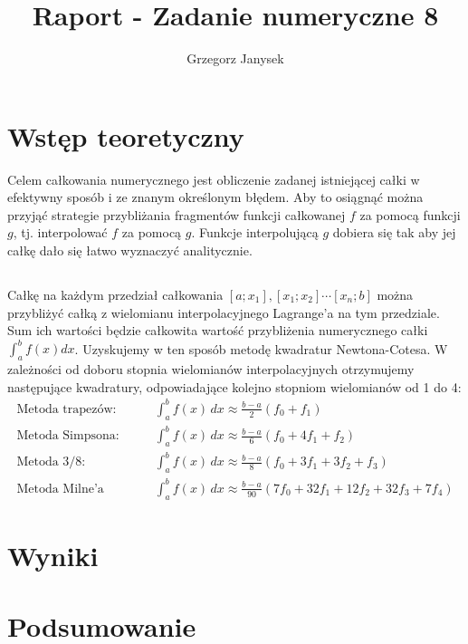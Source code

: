 \documentclass[11pt]{extarticle}
\author{Grzegorz Janysek}
\title{Raport - Zadanie numeryczne 8}
\begin{document}
	\maketitle

	\section{Wstęp teoretyczny}
	Celem całkowania numerycznego jest obliczenie zadanej istniejącej całki w efektywny sposób i ze znanym określonym błędem.
	Aby to osiągnąć można przyjąć strategie przybliżania fragmentów funkcji całkowanej \(f\) za pomocą funkcji \(g\), tj. interpolować \(f\) za pomocą \(g\).
	Funkcje interpolującą \(g\) dobiera się tak aby jej całkę dało się łatwo wyznaczyć analitycznie.

	\subsection{}
	Całkę na każdym przedział całkowania \([a; x_1], [x_1; x_2] \dotsm [x_n; b]\) można przybliżyć całką z wielomianu interpolacyjnego Lagrange'a na tym przedziale.
	Sum ich wartości będzie całkowita wartość przybliżenia numerycznego całki \( \int_a^b f(x) dx\).
	Uzyskujemy w ten sposób metodę kwadratur Newtona-Cotesa.
	W zależności od doboru stopnia wielomianów interpolacyjnych otrzymujemy następujące kwadratury, odpowiadające kolejno stopniom wielomianów od 1 do 4:
	\begin{align}
		\text{Metoda trapezów:} \qquad &
		\int_a^b f(x)\,dx \approx \frac{b-a}{2}(f_0 + f_1) \\
		\text{Metoda Simpsona:} \qquad &
		\int_a^b f(x)\,dx \approx \frac{b-a}{6}(f_0 + 4f_1 + f_2) \\
		\text{Metoda 3/8:} \qquad &
		\int_a^b f(x)\,dx \approx \frac{b-a}{8}(f_0 + 3f_1 + 3f_2 + f_3) \\
		\text{Metoda Milne'a} \qquad &
		\int_a^b f(x)\,dx \approx \frac{b-a}{90}(7f_0 + 32f_1 + 12f_2 + 32f_3 + 7f_4)
	\end{align}
	

	\section{Wyniki}
	
	\section{Podsumowanie}
\end{document}
